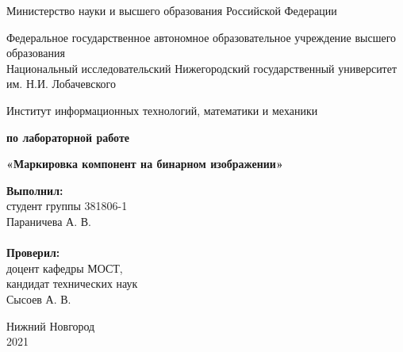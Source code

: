 \documentclass{report}
\begin{document}
	\begin{titlepage}

		\begin{center}
			Министерство науки и высшего образования Российской Федерации
		\end{center}

		\begin{center}
			Федеральное государственное автономное образовательное учреждение высшего образования \\
			Национальный исследовательский Нижегородский государственный университет им. Н.И. Лобачевского
		\end{center}

		\begin{center}
			Институт информационных технологий, математики и механики
		\end{center}

		\vspace{4em}

		\begin{center}
			\textbf{ по лабораторной работе} \\
		\end{center}
		\begin{center}
			\textbf{\Large«Маркировка компонент на бинарном изображении»} \\
		\end{center}

		\vspace{4em}

		\newbox{\lbox}
		\newlength{\maxl}
		\setlength{\maxl}{\wd\lbox}
		\hfill\parbox{7cm}{
			\hspace*{5cm}\hspace*{-5cm}\textbf{Выполнил:} \\ студент группы 381806-1 \\ Параничева А. В.\\
			\\
			\hspace*{5cm}\hspace*{-5cm}\textbf{Проверил:}\\ доцент кафедры МОСТ, \\ кандидат технических наук \\ Сысоев А. В.\\
		}
		\vspace{\fill}

		\begin{center} Нижний Новгород \\ 2021 \end{center}

	\end{titlepage}
\end{document}
